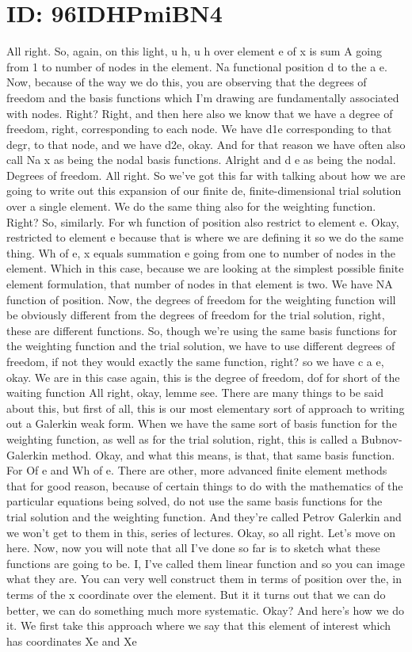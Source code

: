 \documentclass[10pt]{article}
\begin{document}
\section*{ID: 96IDHPmiBN4}
All right. So, again, on this light, u h, u h over element e of x is sum A going from 1 to number of nodes in the element. Na functional position d to the a e. Now, because of the way we do this, you are observing that the degrees of freedom and the basis functions which I'm drawing are fundamentally associated with nodes. Right? Right, and then here also we know that we have a degree of freedom, right, corresponding to each node. We have d1e corresponding to that degr, to that node, and we have d2e, okay. And for that reason we have often also call Na x as being the nodal basis functions. Alright and d e as being the nodal. Degrees of freedom. All right. So we've got this far with talking about how we are going to write out this expansion of our finite de, finite-dimensional trial solution over a single element. We do the same thing also for the weighting function. Right? So, similarly. For wh function of position also restrict to element e. Okay, restricted to element e because that is where we are defining it so we do the same thing. Wh of e, x equals summation e going from one to number of nodes in the element. Which in this case, because we are looking at the simplest possible finite element formulation, that number of nodes in that element is two. We have NA function of position. Now, the degrees of freedom for the weighting function will be obviously different from the degrees of freedom for the trial solution, right, these are different functions. So, though we're using the same basis functions for the weighting function and the trial solution, we have to use different degrees of freedom, if not they would exactly the same function, right? so we have c a e, okay. We are in this case again, this is the degree of freedom, dof for short of the waiting function All right, okay, lemme see. There are many things to be said about this, but first of all, this is our most elementary sort of approach to writing out a Galerkin weak form. When we have the same sort of basis function for the weighting function, as well as for the trial solution, right, this is called a Bubnov-Galerkin method. Okay, and what this means, is that, that same basis function. For Of e and Wh of e. There are other, more advanced finite element methods that for good reason, because of certain things to do with the mathematics of the particular equations being solved, do not use the same basis functions for the trial solution and the weighting function. And they're called Petrov Galerkin and we won't get to them in this, series of lectures. Okay, so all right. Let's move on here. Now, now you will note that all I've done so far is to sketch what these functions are going to be. I, I've called them linear function and so you can image what they are. You can very well construct them in terms of position over the, in terms of the x coordinate over the element. But it it turns out that we can do better, we can do something much more systematic. Okay? And here's how we do it. We first take this approach where we say that this element of interest which has coordinates Xe and Xe 
\end{document}
